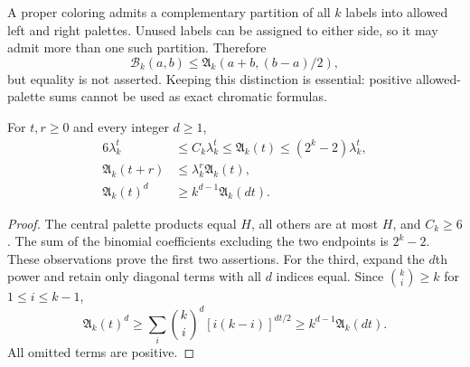 \documentclass[11pt,a4paper]{article}
\numberwithin{equation}{section}
\theoremstyle{definition}
\theoremstyle{remark}
\newcommand{\Bip}{\mathcal B}
\newcommand{\nlenv}{\mathfrak A}
\begin{document}
\begin{remark}
A proper coloring admits a complementary partition of all $k$ labels into
allowed left and right palettes. Unused labels can be assigned to either
side, so it may admit more than one such partition. Therefore
\begin{equation}\label{nl:eq:envelopeupper}
 \Bip_k(a,b)\le\nlenv_k(a+b,(b-a)/2),
\end{equation}
but equality is not asserted. Keeping this distinction is essential:
positive allowed-palette sums cannot be used as exact chromatic formulas.
\end{remark}

\begin{lemma}\label{nl:lem:amplify}
For $t,r\ge0$ and every integer $d\ge1$,
\begin{align}
 6\lambda_k^t&\le C_k\lambda_k^t\le\nlenv_k(t)
                \le(2^k-2)\lambda_k^t,\label{nl:eq:Abounds}\\
 \nlenv_k(t+r)&\le\lambda_k^r\nlenv_k(t),\label{nl:eq:scaling}\\
 \nlenv_k(t)^d&\ge k^{d-1}\nlenv_k(dt).\label{nl:eq:amplification}
\end{align}
\end{lemma}
\begin{proof}
The central palette products equal $H$, all others are at most $H$, and
$C_k\ge6$. The sum of the binomial coefficients excluding the two endpoints
is $2^k-2$. These observations prove the first two assertions.
For the third, expand the $d$th power and retain only diagonal terms with
all $d$ indices equal. Since $\binom ki\ge k$ for $1\le i\le k-1$,
\[
 \nlenv_k(t)^d\ge\sum_i\binom ki^{\!d}[i(k-i)]^{dt/2}
 \ge k^{d-1}\nlenv_k(dt).
\]
All omitted terms are positive.
\end{proof}
\end{document}
